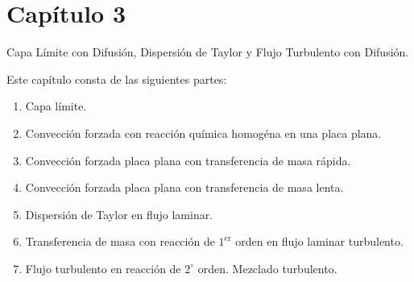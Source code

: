 \chapter{Capítulo 3}
Capa Límite con Difusión, Dispersión de Taylor y Flujo Turbulento con Difusión.

Este capítulo consta de las siguientes partes:
\begin{enumerate}
    \item Capa límite.
    \item Convección forzada con reacción química homogéna en una placa plana.
    \item Convección forzada  placa plana con transferencia de masa rápida.
    \item Convección forzada  placa plana con transferencia de masa lenta.
    \item Dispersión de Taylor en flujo laminar.
    \item Transferencia de masa con reacción de $1^{\text{er}}$ orden en flujo laminar turbulento.
    \item Flujo turbulento en reacción de $2^{\circ}$ orden. Mezclado turbulento.
\end{enumerate}
